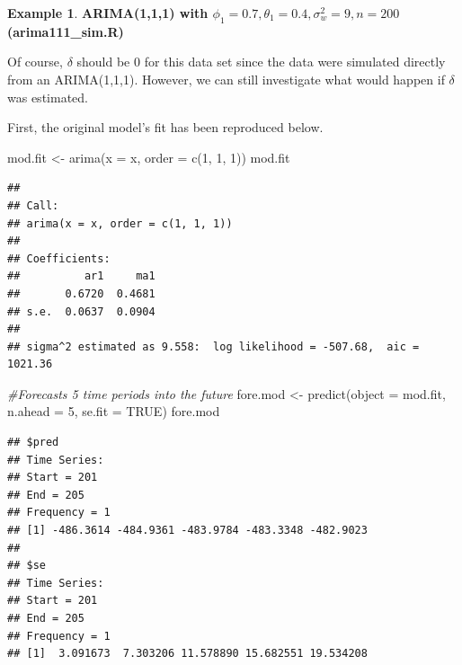 \documentclass[
]{book}
\newenvironment{Shaded}{\begin{snugshade}}{\end{snugshade}}
\newcommand{\AttributeTok}[1]{\textcolor[rgb]{0.77,0.63,0.00}{#1}}
\newcommand{\CommentTok}[1]{\textcolor[rgb]{0.56,0.35,0.01}{\textit{#1}}}
\newcommand{\ConstantTok}[1]{\textcolor[rgb]{0.00,0.00,0.00}{#1}}
\newcommand{\DecValTok}[1]{\textcolor[rgb]{0.00,0.00,0.81}{#1}}
\newcommand{\FunctionTok}[1]{\textcolor[rgb]{0.00,0.00,0.00}{#1}}
\newcommand{\NormalTok}[1]{#1}
\newcommand{\OtherTok}[1]{\textcolor[rgb]{0.56,0.35,0.01}{#1}}
\newcommand{\SpecialCharTok}[1]{\textcolor[rgb]{0.00,0.00,0.00}{#1}}
\newcommand{\StringTok}[1]{\textcolor[rgb]{0.31,0.60,0.02}{#1}}
\theoremstyle{definition}
\theoremstyle{definition}
\newtheorem{example}{Example}[chapter]
\theoremstyle{definition}
\theoremstyle{definition}
\theoremstyle{remark}
\begin{document}
\begin{example}

\textbf{ARIMA(1,1,1) with \(\phi_1=0.7, \theta_1=0.4, \sigma_w^2=9, n=200\) (arima111\_sim.R)}

Of course, \(\delta\) should be 0 for this data set since the data were simulated directly from an ARIMA(1,1,1). However, we can still investigate what would happen if \(\delta\) was estimated.

First, the original model's fit has been reproduced below.

\begin{Shaded}
\end{Shaded}

\begin{Shaded}
\begin{Highlighting}[]
\NormalTok{mod.fit }\OtherTok{\textless{}{-}} \FunctionTok{arima}\NormalTok{(}\AttributeTok{x =}\NormalTok{ x, }\AttributeTok{order =} \FunctionTok{c}\NormalTok{(}\DecValTok{1}\NormalTok{, }\DecValTok{1}\NormalTok{, }\DecValTok{1}\NormalTok{))}
\NormalTok{mod.fit}
\end{Highlighting}
\end{Shaded}

\begin{verbatim}
## 
## Call:
## arima(x = x, order = c(1, 1, 1))
## 
## Coefficients:
##          ar1     ma1
##       0.6720  0.4681
## s.e.  0.0637  0.0904
## 
## sigma^2 estimated as 9.558:  log likelihood = -507.68,  aic = 1021.36
\end{verbatim}

\begin{Shaded}
\begin{Highlighting}[]
\CommentTok{\#Forecasts 5 time periods into the future}
\NormalTok{fore.mod }\OtherTok{\textless{}{-}} \FunctionTok{predict}\NormalTok{(}\AttributeTok{object =}\NormalTok{ mod.fit, }\AttributeTok{n.ahead =} \DecValTok{5}\NormalTok{, se.fit }
                      \OtherTok{=} \ConstantTok{TRUE}\NormalTok{) }
\NormalTok{fore.mod}
\end{Highlighting}
\end{Shaded}

\begin{verbatim}
## $pred
## Time Series:
## Start = 201 
## End = 205 
## Frequency = 1 
## [1] -486.3614 -484.9361 -483.9784 -483.3348 -482.9023
## 
## $se
## Time Series:
## Start = 201 
## End = 205 
## Frequency = 1 
## [1]  3.091673  7.303206 11.578890 15.682551 19.534208
\end{verbatim}


\end{example}
\end{document}
